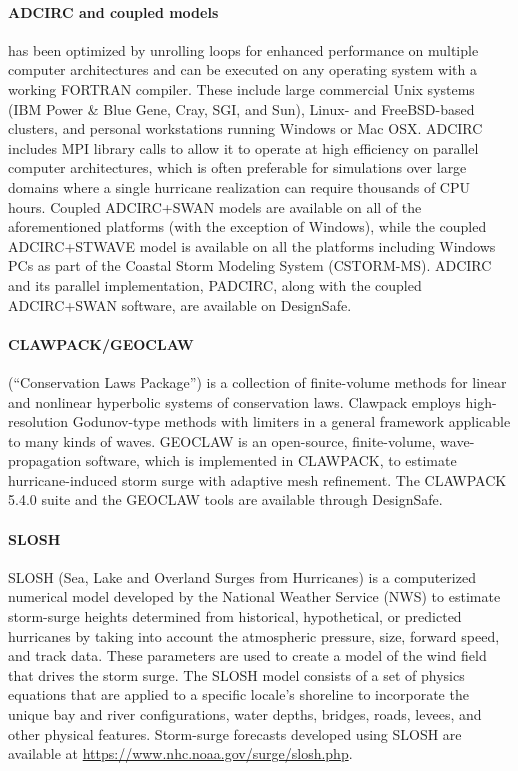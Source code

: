 \paragraph{ADCIRC and coupled models}  has been optimized by unrolling loops for enhanced performance on multiple computer architectures and can be executed on any operating system with a working FORTRAN compiler. These include large commercial Unix systems (IBM Power \& Blue Gene, Cray, SGI, and Sun), Linux- and FreeBSD-based clusters, and personal workstations running Windows or Mac OSX. ADCIRC includes MPI library calls to allow it to operate at high efficiency on parallel computer architectures, which is often preferable for simulations over large domains where a single hurricane realization can require thousands of CPU hours. Coupled ADCIRC+SWAN models are available on all of the aforementioned platforms (with the exception of Windows), while the coupled ADCIRC+STWAVE model is available on all the platforms including Windows PCs as part of the Coastal Storm Modeling System (CSTORM-MS). ADCIRC and its parallel implementation, PADCIRC, along with the coupled ADCIRC+SWAN software, are available on DesignSafe.

\paragraph{CLAWPACK/GEOCLAW}  (``Conservation Laws Package'') is a collection of finite-volume methods for linear and nonlinear hyperbolic systems of conservation laws. Clawpack employs high-resolution Godunov-type methods with limiters in a general framework applicable to many kinds of waves. GEOCLAW is an open-source, finite-volume, wave-propagation software, which is implemented in CLAWPACK, to estimate hurricane-induced storm surge with adaptive mesh refinement. The CLAWPACK 5.4.0 suite and the GEOCLAW tools are available through DesignSafe.

\paragraph{SLOSH} SLOSH (Sea, Lake and Overland Surges from Hurricanes) is a computerized numerical model developed by the National Weather Service (NWS) to estimate storm-surge heights determined from historical, hypothetical, or predicted hurricanes by taking into account the atmospheric pressure, size, forward speed, and track data. These parameters are used to create a model of the wind field that drives the storm surge. The SLOSH model consists of a set of physics equations that are applied to a specific locale's shoreline to incorporate the unique bay and river configurations, water depths, bridges, roads, levees, and other physical features. Storm-surge forecasts developed using SLOSH are available at \url{https://www.nhc.noaa.gov/surge/slosh.php}.

